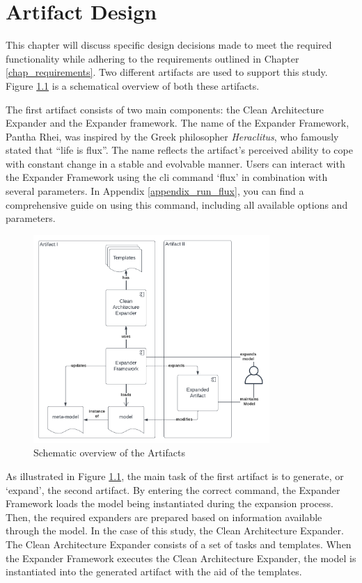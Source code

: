 \chapter{Artifact Design} \label{chap_designing_artifacts}

This chapter will discuss specific design decisions made to meet the required
functionality while adhering to the requirements outlined in Chapter
\ref{chap_requirements}. Two different artifacts are used to support this study. Figure
\ref{fig_overview_design} is a schematical overview of both these artifacts.

The first artifact consists of two main components: the Clean Architecture Expander and
the Expander framework. The name of the Expander Framework, Pantha Rhei, was inspired by
the Greek philosopher \emph{Heraclitus}, who famously stated that \enquote{life is flux}.
The name reflects the artifact's perceived ability to cope with constant change in a
stable and evolvable manner. Users can interact with the Expander Framework using the
\gls{cli} command \enquote*{flux} in combination with several parameters. In Appendix
\ref{appendix_run_flux}, you can find a comprehensive guide on using this command,
including all available options and parameters.



\begin{figure}[H]
    \centering
    \includegraphics[width=0.8\textwidth]{figures/artifactOverview.pdf}
    \caption[Schematic overview of the Artifacts]{Schematic overview of the Artifacts}
    \label{fig_overview_design}
  \end{figure}

  As illustrated in Figure \ref{fig_overview_design}, the main task of the first artifact
  is to generate, or \enquote*{expand}, the second artifact. By entering the correct
  command, the Expander Framework loads the model being instantiated during the expansion
  process. Then, the required expanders are prepared based on information available
  through the model. In the case of this study, the Clean Architecture Expander. The Clean
  Architecture Expander consists of a set of tasks and templates. When the Expander
  Framework executes the Clean Architecture Expander, the model is instantiated into the
  generated artifact with the aid of the templates.

